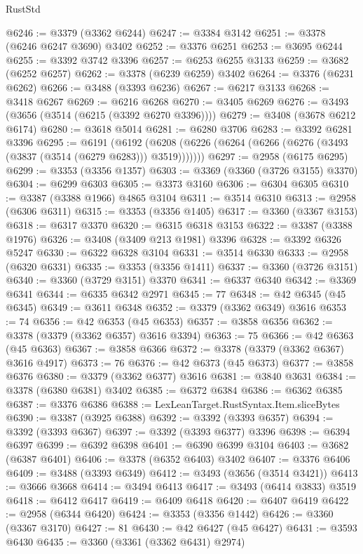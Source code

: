 \begin{lexlean}{RustStd}
\begin{coremodule}
@6246 := @3379 (@3362 @6244)
@6247 := @3384 @3142
@6251 := @3378 (@6246 @6247 @3690) @3402
@6252 := @3376 @6251
@6253 := @3695 @6244
@6255 := @3392 @3742 @3396
@6257 := @6253 @6255 @3133
@6259 := @3682 (@6252 @6257)
@6262 := @3378 (@6239 @6259) @3402
@6264 := @3376 (@6231 @6262)
@6266 := @3488 (@3393 @6236)
@6267 := @6217 @3133
@6268 := @3418 @6267
@6269 := @6216 @6268
@6270 := @3405 @6269
@6276 := @3493 (@3656 (@3514 (@6215 (@3392 @6270 @3396))))
@6279 := @3408 (@3678 @6212 @6174)
@6280 := @3618 @5014
@6281 := @6280 @3706
@6283 := @3392 @6281 @3396
@6295 := @6191
    (@6192 (@6208 (@6226 (@6264 (@6266 (@6276 (@3493 (@3837 (@3514 (@6279 @6283))) @3519)))))))
@6297 := @2958 (@6175 @6295)
@6299 := @3353 (@3356 @1357)
@6303 := @3369 (@3360 (@3726 @3155) @3370)
@6304 := @6299 @6303
@6305 := @3373 @3160
@6306 := @6304 @6305
@6310 := @3387 (@3388 @1966) @4865 @3104
@6311 := @3514 @6310
@6313 := @2958 (@6306 @6311)
@6315 := @3353 (@3356 @1405)
@6317 := @3360 (@3367 @3153)
@6318 := @6317 @3370
@6320 := @6315 @6318 @3153
@6322 := @3387 (@3388 @1976)
@6326 := @3408 (@3409 @213 @1981) @3396
@6328 := @3392 @6326 @5247
@6330 := @6322 @6328 @3104
@6331 := @3514 @6330
@6333 := @2958 (@6320 @6331)
@6335 := @3353 (@3356 @1411)
@6337 := @3360 (@3726 @3151)
@6340 := @3360 (@3729 @3151) @3370
@6341 := @6337 @6340
@6342 := @3369 @6341
@6344 := @6335 @6342 @2971
@6345 := 77
@6348 := @42 @6345 (@45 @6345)
@6349 := @3611 @6348
@6352 := @3379 (@3362 @6349) @3616
@6353 := 74
@6356 := @42 @6353 (@45 @6353)
@6357 := @3858 @6356
@6362 := @3378 (@3379 (@3362 @6357) @3616 @3394)
@6363 := 75
@6366 := @42 @6363 (@45 @6363)
@6367 := @3858 @6366
@6372 := @3378 (@3379 (@3362 @6367) @3616 @4917)
@6373 := 76
@6376 := @42 @6373 (@45 @6373)
@6377 := @3858 @6376
@6380 := @3379 (@3362 @6377) @3616
@6381 := @3840 @3631
@6384 := @3378 (@6380 @6381) @3402
@6385 := @6372 @6384
@6386 := @6362 @6385
@6387 := @3376 @6386
@6388 := LexLeanTarget.RustSyntax.Item.sliceBytes
@6390 := @3387 (@3925 @6388)
@6392 := @3392 (@3393 @6357)
@6394 := @3392 (@3393 @6367)
@6397 := @3392 (@3393 @6377) @3396
@6398 := @6394 @6397
@6399 := @6392 @6398
@6401 := @6390 @6399 @3104
@6403 := @3682 (@6387 @6401)
@6406 := @3378 (@6352 @6403) @3402
@6407 := @3376 @6406
@6409 := @3488 (@3393 @6349)
@6412 := @3493 (@3656 (@3514 @3421))
@6413 := @3666 @3668
@6414 := @3494 @6413
@6417 := @3493 (@6414 @3833) @3519
@6418 := @6412 @6417
@6419 := @6409 @6418
@6420 := @6407 @6419
@6422 := @2958 (@6344 @6420)
@6424 := @3353 (@3356 @1442)
@6426 := @3360 (@3367 @3170)
@6427 := 81
@6430 := @42 @6427 (@45 @6427)
@6431 := @3593 @6430
@6435 := @3360 (@3361 (@3362 @6431) @2974)

\end{coremodule}
\end{lexlean}
